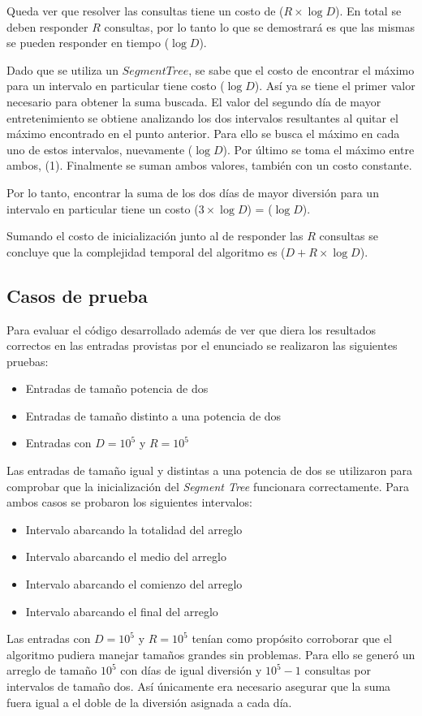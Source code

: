 Queda ver que resolver las consultas tiene un costo de \ord($R \times \log{D}$).
En total se deben responder $R$ consultas, por lo tanto lo que se demostrará es
que las mismas se pueden responder en tiempo \ord($\log{D}$).

Dado que se utiliza un $Segment Tree$, se sabe que el costo de encontrar el máximo
para un intervalo en particular tiene costo \ord($\log{D}$). Así ya se tiene el
primer valor necesario para obtener la suma buscada. El valor del segundo día de
mayor entretenimiento se obtiene analizando los dos intervalos resultantes al
quitar el máximo encontrado en el punto anterior. Para ello se busca el máximo
en cada uno de estos intervalos, nuevamente \ord($\log{D}$). Por último se toma
el máximo entre ambos, \ord(1). Finalmente se suman ambos valores, también con
un costo constante.

Por lo tanto, encontrar la suma de los dos días de mayor diversión para un
intervalo en particular tiene un costo \ord($3 \times \log{D}$) =
\ord($\log{D}$).

Sumando el costo de inicialización junto al de responder las $R$ consultas se
concluye que la complejidad temporal del algoritmo es \ord($D + R \times
\log{D}$).

\subsection{Casos de prueba}

Para evaluar el código desarrollado además de ver que diera los resultados
correctos en las entradas provistas por el enunciado se realizaron las
siguientes pruebas:

\begin{itemize}
	\item{Entradas de tamaño potencia de dos}
	\item{Entradas de tamaño distinto a una potencia de dos}
	\item{Entradas con $D = 10^5$ y $R = 10^5$}
\end{itemize}

Las entradas de tamaño igual y distintas a una potencia de dos se utilizaron
para comprobar que la inicialización del \emph{Segment Tree} funcionara
correctamente. Para ambos casos se probaron los siguientes intervalos:

\begin{itemize}
	\item{Intervalo abarcando la totalidad del arreglo}
	\item{Intervalo abarcando el medio del arreglo}
	\item{Intervalo abarcando el comienzo del arreglo}
	\item{Intervalo abarcando el final del arreglo}
\end{itemize}

Las entradas con $D = 10^5$ y $R = 10^5$ tenían como propósito corroborar que el
algoritmo pudiera manejar tamaños grandes sin problemas. Para ello se generó un
arreglo de tamaño $10^5$ con días de igual diversión y $10^5 - 1$ consultas por
intervalos de tamaño dos. Así únicamente era necesario asegurar que la suma
fuera igual a el doble de la diversión asignada a cada día.
